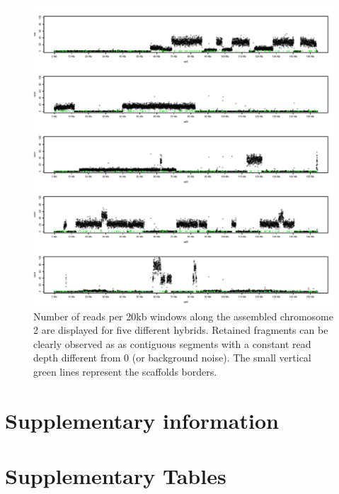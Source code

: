\documentclass[10pt,letterpaper]{article}
\begin{document}
\begin{figure}[h!]
   \includegraphics[scale=0.7]{figure3_genome_coverage.pdf}
  \caption{
      Number of reads per 20kb windows along the assembled chromosome 2 are displayed for five different hybrids. Retained fragments can be clearly observed as as contiguous segments with a constant read depth different from 0 (or background noise). The small vertical green lines represent the scaffolds borders.}
\label{fig3}    
\end{figure}

\clearpage
\newpage

\section*{Supplementary information} 


\renewcommand{\tablename}{Supplementary Table}

\section*{Supplementary Tables} 
\end{document}
